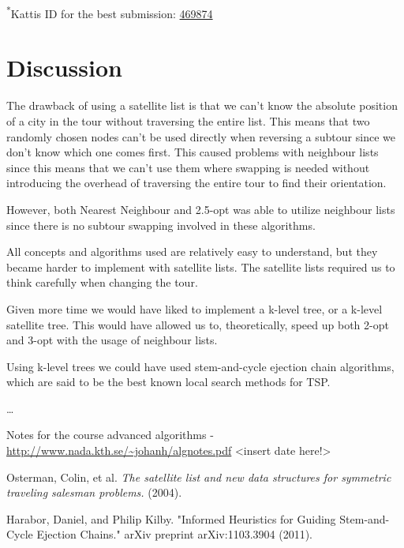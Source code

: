 \documentclass[paper=a4, fontsize=11pt,numbers=endperiod]{scrartcl} %
\numberwithin{equation}{section} %
\numberwithin{figure}{section} %
\numberwithin{table}{section} %
\begin{document}
\textsuperscript{*}Kattis ID for the best submission: \href{https://kth.kattis.scrool.se/submission?id=469874}{469874}





\section{Discussion}


The drawback of using a satellite list is that we can't know the absolute position of a city in the tour without traversing the entire list. This means that two randomly chosen nodes can't be used directly when reversing a subtour since we don't know which one comes first. This caused problems with neighbour lists since this means that we can't use them where swapping is needed without introducing the overhead of traversing the entire tour to find their orientation.

However, both Nearest Neighbour and 2.5-opt was able to utilize neighbour lists since there is no subtour swapping involved in these algorithms.

All concepts and algorithms used are relatively easy to understand, but they became harder to implement with satellite lists.
The satellite lists required us to think carefully when changing the tour.


Given more time we would have liked to implement a k-level tree, or a k-level satellite tree.
This would have allowed us to, theoretically, speed up both 2-opt and 3-opt with the usage of neighbour lists.

Using k-level trees we could have used stem-and-cycle ejection chain algorithms, which are said to be the best known local search methods for TSP.\cite{stem-cycle}

\dots




\newpage
\begin{thebibliography}{9}

 Notes for the course advanced algorithms - \url{http://www.nada.kth.se/~johanh/algnotes.pdf} <insert date here!>
 
 Osterman, Colin, et al. \emph{The satellite list and new data structures for symmetric traveling salesman problems.} (2004).

 Harabor, Daniel, and Philip Kilby. "Informed Heuristics for Guiding Stem-and-Cycle Ejection Chains." arXiv preprint arXiv:1103.3904 (2011).
\end{thebibliography}
\end{document}
